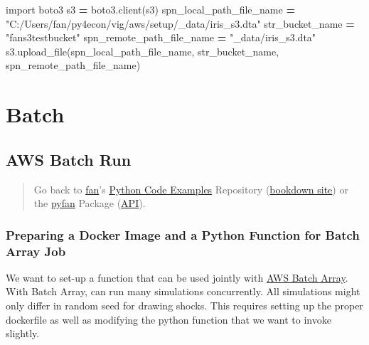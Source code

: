 \documentclass[
]{book}
\newenvironment{Shaded}{\begin{snugshade}}{\end{snugshade}}
\newcommand{\ImportTok}[1]{#1}
\newcommand{\NormalTok}[1]{#1}
\newcommand{\OperatorTok}[1]{\textcolor[rgb]{0.81,0.36,0.00}{\textbf{#1}}}
\newcommand{\StringTok}[1]{\textcolor[rgb]{0.31,0.60,0.02}{#1}}
\begin{document}
\begin{Shaded}
\begin{Highlighting}[]
\ImportTok{import}\NormalTok{ boto3}
\NormalTok{s3 }\OperatorTok{=}\NormalTok{ boto3.client(}\StringTok{\textquotesingle{}s3\textquotesingle{}}\NormalTok{)}
\NormalTok{spn\_local\_path\_file\_name }\OperatorTok{=} \StringTok{"C:/Users/fan/py4econ/vig/aws/setup/\_data/iris\_s3.dta"}
\NormalTok{str\_bucket\_name }\OperatorTok{=} \StringTok{"fans3testbucket"}
\NormalTok{spn\_remote\_path\_file\_name }\OperatorTok{=} \StringTok{"\_data/iris\_s3.dta"}
\NormalTok{s3.upload\_file(spn\_local\_path\_file\_name, str\_bucket\_name, spn\_remote\_path\_file\_name)}
\end{Highlighting}
\end{Shaded}

\hypertarget{batch}{%
\section{Batch}\label{batch}}

\hypertarget{aws-batch-run}{%
\subsection{AWS Batch Run}\label{aws-batch-run}}

\begin{quote}
Go back to \href{http://fanwangecon.github.io/}{fan}'s \href{https://fanwangecon.github.io/Py4Econ/}{Python Code Examples} Repository (\href{https://fanwangecon.github.io/Py4Econ/bookdown}{bookdown site}) or the \href{https://pyfan.readthedocs.io/en/latest/}{pyfan} Package (\href{https://pyfan.readthedocs.io/en/latest/reference.html}{API}).
\end{quote}

\hypertarget{preparing-a-docker-image-and-a-python-function-for-batch-array-job}{%
\subsubsection{Preparing a Docker Image and a Python Function for Batch Array Job}\label{preparing-a-docker-image-and-a-python-function-for-batch-array-job}}

We want to set-up a function that can be used jointly with \href{https://docs.aws.amazon.com/batch/latest/userguide/array_jobs.html}{AWS Batch Array}. With Batch Array, can run many simulations concurrently. All simulations might only differ in random seed for drawing shocks. This requires setting up the proper dockerfile as well as modifying the python function that we want to invoke slightly.
\end{document}
